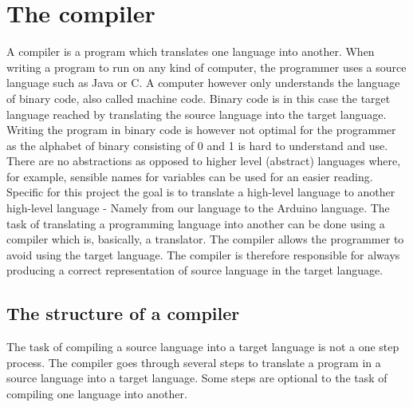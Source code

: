 \chapter{The compiler} \label{chap:the_compiler}
A compiler is a program which translates one language into another. When writing a program to run on any kind of computer, the programmer uses a source language such as Java or C. A computer however only understands the language of binary code, also called machine code. Binary code is in this case the target language reached by translating the source language into the target language. Writing the program in binary code is however not optimal for the programmer as the alphabet of binary consisting of 0 and 1 is hard to understand and use. There are no abstractions as opposed to higher level (abstract) languages where, for example, sensible names for variables can be used for an easier reading.\\
Specific for this project the goal is to translate a high-level language to another high-level language - Namely from our language to the Arduino language. The task of translating a programming language into another can be done using a compiler which is, basically, a translator. The compiler allows the programmer to avoid using the target language. The compiler is therefore responsible for always producing a correct representation of source language in the target language.

\section{The structure of a compiler}
The task of compiling a source language into a target language is not a one step process. The compiler goes through several steps to translate a program in a source language into a target language. Some steps are optional to the task of compiling one language into another.\cite{compiler:structure}\\

